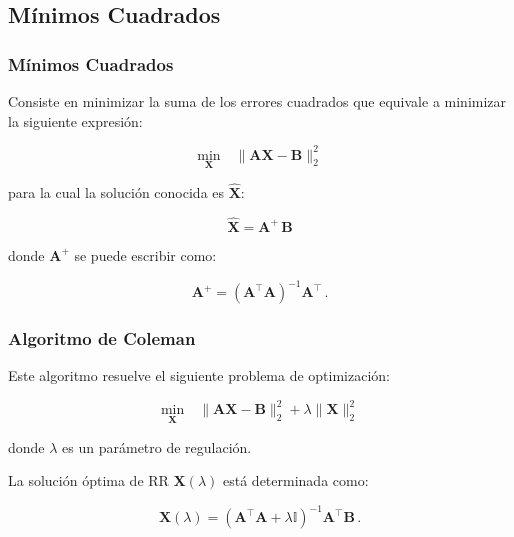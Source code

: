 \documentclass{beamer}
\begin{document}
        \subsection{Mínimos Cuadrados}
            \begin{frame}
            \frametitle{Mínimos Cuadrados}
            Consiste en minimizar la suma de los errores cuadrados que equivale
            a minimizar la siguiente expresión:
            
            \begin{equation}
            \label{eq:regressionproblem}
            \underset{\mathbf{X}}{\text{min}} \quad \| \mathbf{A}\mathbf{\mathbf{X}} - \mathbf{B} \|_2^2
            \end{equation}
            
            \noindent para la cual la solución conocida es $\hat{\mathbf{X}}$:
            
            \begin{equation}
            \label{eq:MP}
            \hat{\mathbf{X}}=\mathbf{A}^{\!\!+}\,\mathbf{B}
            \end{equation}
            
            \noindent donde $\mathbf{A}^{\!\!+}$ se puede escribir como:
            
            \begin{equation}
            \label{eq:pseudoinverse}
            \mathbf{A}^{\!\!+}= (\mathbf{A}^{\!\!\top} \mathbf{A})^{-1}\mathbf{A}^{\!\!\top} \, .
            \end{equation}

            \end{frame}
            \begin{frame}
            \frametitle{Algoritmo de Coleman}
            Este algoritmo resuelve el siguiente problema de optimización:
            
            \begin{equation}
            \label{eq:RRproblem}
            \underset{\mathbf{X}}{\text{min}} \quad \|
            \mathbf{A}\mathbf{\mathbf{X}} - \mathbf{B} \|_2^2 +\lambda \|
            \mathbf{\mathbf{X}}\|_2^2 
            \end{equation}
            
            \noindent donde $\lambda$ es un parámetro de regulación.
            
            La solución óptima de RR $\mathbf{X}(\lambda)$ está determinada como:
            
            \begin{equation}
            \label{eq:optsolRR}
            \mathbf{X}(\lambda)=(\mathbf{A}^\top \mathbf{A}+ \lambda
            \mathbb{I})^{-1}\mathbf{A}^\top \mathbf{B} \, . 
            \end{equation}

            \end{frame}
\end{document}
